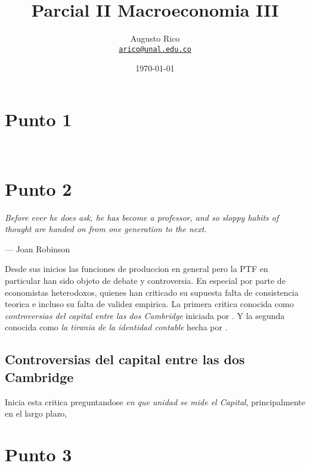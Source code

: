 \documentclass[11pt]{article}
\title{Parcial II Macroeconomia III
}
\author{Augusto Rico\\
    \href{mailto:arico@unal.edu.co}{\texttt{arico@unal.edu.co}}
    }
\date{\today}
\begin{document}

\section{Punto 1}

\begin{flushleft}
    ~\\
\end{flushleft}

\newpage

\section{Punto 2}

\epigraph{ \itshape Before ever he does ask, he has become a professor, and so sloppy habits of thought are handed on from one generation to the next.}
            {--- Joan Robinson }

\begin{flushleft}
    Desde sus inicios las funciones de produccion en general pero la PTF en particular han sido objeto de debate y controversia. En especial por parte de economistas heterodoxos, 
    quienes han criticado su supuesta falta de consistencia teorica e incluso su falta de validez empirica.
    La primera critica conocida como \textit{controversias del capital entre las dos Cambridge} iniciada por \citet{robinson_1953}. 
    Y la segunda conocida como \textit{la tirania de la identidad contable} hecha por \citet{shaikh_1974}.

    \subsection{Controversias del capital entre las dos Cambridge}
    \citet{robinson_1953} Inicia esta critica preguntandose \textit{en que unidad se mide el Capital}, principalmente en el largo plazo, 
\end{flushleft}

\newpage

\section{Punto 3}

\begin{flushleft}
    ~\\
\end{flushleft}

\newpage

\medskip

 

\newpage
\end{document}
